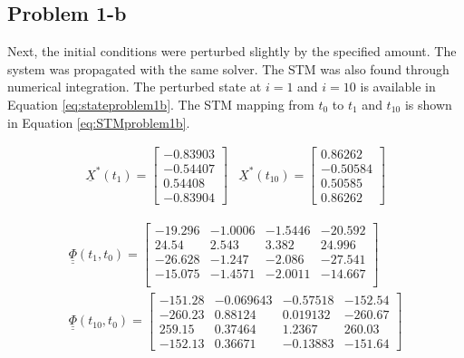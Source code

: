 \documentclass[11pt]{article}
\begin{document}
\subsection{Problem 1-b}

Next, the initial conditions were perturbed slightly by the specified amount. The system was propagated with the same solver. The STM was also found through numerical integration. The perturbed state at $i=1$ and $i=10$ is available in Equation \eqref{eq:stateproblem1b}. The STM mapping from $t_0$ to $t_{1}$ and $t_{10}$ is shown in Equation \eqref{eq:STMproblem1b}.

\begin{equation}
	\label{eq:stateproblem1b}
	\begin{array}{lr}
		\underline{X}^*(t_1) = \begin{bmatrix}
			-0.83903 \\
			-0.54407 \\
			0.54408 \\
			-0.83904
		\end{bmatrix} & \underline{X}^*(t_{10}) = \begin{bmatrix}
			 0.86262 \\
			-0.50584 \\
			0.50585 \\
			0.86262
		\end{bmatrix}
	\end{array}
\end{equation}

\begin{equation}
	\label{eq:STMproblem1b}
	\begin{array}{c}
		\underline{\underline{\Phi}}(t_1, t_0) = \begin{bmatrix}
			-19.296 & -1.0006 & -1.5446 & -20.592 \\
			24.54  & 2.543 & 3.382 & 24.996 \\
			-26.628 & -1.247 & -2.086 & -27.541 \\
			-15.075 & -1.4571 & -2.0011 & -14.667 \\
		\end{bmatrix} \\
		\underline{\underline{\Phi}}(t_{10}, t_0) = \begin{bmatrix}
			-151.28 & -0.069643 & -0.57518 & -152.54 \\
			-260.23 &  0.88124  &  0.019132 &  -260.67 \\
			259.15 &  0.37464  &   1.2367  &  260.03 \\
			-152.13 &  0.36671 & -0.13883 & -151.64  
			
		\end{bmatrix}
	\end{array}
\end{equation}
\end{document}
